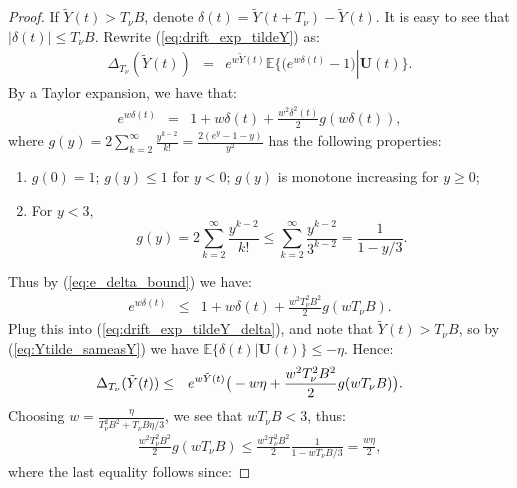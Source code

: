 \documentclass[journal]{IEEEtran}
\newcommand{\expect}[1]{\mathbb{E}\big\{#1\big\}}
\newcommand{\bv}[1]{{\boldsymbol{#1} }}
\begin{document}
\begin{proof}
If $\tilde{Y}(t)>T_{\nu}B $, denote $\delta(t)=\tilde{Y}(t+T_{\nu})-\tilde{Y}(t)$. It is easy to see that $|\delta(t)|\leq T_{\nu}B$. Rewrite (\ref{eq:drift_exp_tildeY}) as:
\begin{eqnarray}
\Delta_{T_{\nu}}(\tilde{Y}(t))%
&=&e^{w\tilde{Y}(t)}\expect{\big(e^{w\delta(t)}-1\big)\left|\right.\bv{U}(t)}.\label{eq:drift_exp_tildeY_delta}
\end{eqnarray}
By a Taylor expansion, we have that:
\begin{eqnarray}
e^{w\delta(t)}&=& 1+w\delta(t)+\frac{w^2\delta^2(t)}{2}g(w\delta(t)),\label{eq:e_delta_bound}
\end{eqnarray}
where $g(y)=2\sum_{k=2}^{\infty}\frac{y^{k-2}}{k!}=\frac{2(e^y-1-y)}{y^2}$ \cite{chung_concentration} has the following properties: 
\begin{enumerate}
\item $g(0)=1$; $g(y)\leq1$ for $y<0$; $g(y)$ is monotone increasing for $y\geq0$; 
\item For $y< 3$, 
\[g(y)=2\sum_{k=2}^{\infty}\frac{y^{k-2}}{k!}\leq \sum_{k=2}^{\infty}\frac{y^{k-2}}{3^{k-2}}=\frac{1}{1-y/3}.\]
\end{enumerate}
Thus by (\ref{eq:e_delta_bound}) we have: 
\begin{eqnarray}
e^{w\delta(t)}&\leq& 1+w\delta(t)+\frac{w^2T^2_{\nu}B^2}{2}g(wT_{\nu}B).\label{eq:e_delta_bound_g}
\end{eqnarray}
Plug this into (\ref{eq:drift_exp_tildeY_delta}), and note that $\tilde{Y}(t)>T_{\nu}B$, so  by (\ref{eq:Ytilde_sameasY}) we have $\expect{\delta(t)\left|\right.\bv{U}(t)}\leq-\eta$. Hence: 
\begin{eqnarray}
\hspace{-.2in}\Delta_{T_{\nu}}(\tilde{Y}(t)) &\leq&e^{w\tilde{Y}(t)}\big(-w\eta+\frac{w^2T^2_{\nu}B^2}{2}g(wT_{\nu}B)\big).\label{eq:drift_exp_tildeY_gB_alter}
\end{eqnarray}
Choosing $w=\frac{\eta}{T^2_{\nu}B^2+T_{\nu}B\eta/3}$, we see that $wT_{\nu}B<3$, thus:
\begin{eqnarray*}
\frac{w^2T^2_{\nu}B^2}{2}g(wT_{\nu}B)\leq \frac{w^2T^2_{\nu}B^2}{2}\frac{1}{1-wT_{\nu}B/3}=\frac{w\eta}{2},
\end{eqnarray*}
where the last equality follows since:

\end{proof}
\end{document}
